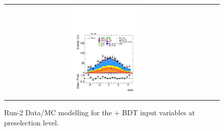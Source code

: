 \begin{figure}[htbp]
\begin{tabular}{@{}c c c@{}}
    \includegraphics[width=0.33\textwidth]{images/plots_modelling_run2_run3_variables/run_2_tth/plot_eta4_hh_tth_15_16_17_18.pdf}
  \end{tabular}

  \caption{Run-2 Data/MC modelling for the \thqb + \ttH BDT input variables at preselection level.}
  \label{tth_vars_modelling_run2_1}
\end{figure}

